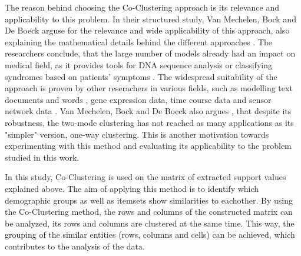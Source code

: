 The reason behind choosing the Co-Clustering approach is its relevance and applicability to this problem. In their structured study, Van Mechelen, Bock and De Boeck arguse for the relevance and wide applicability of this approach, also explaining the mathematical details behind the different approaches \cite{coclustering}. The researchers conclude, that the large number of models already had an impact on medical field, as it provides tools for DNA sequence analysis or classifying syndromes based on patients' symptoms \cite{coclustering}.  The widespread suitability of the approach is proven by other reserachers in various fields, such as modelling text documents and words \cite{coclustering_documents}, gene expression data, time course data and sensor network data \cite{cho2008co}. Van Mechelen, Bock and De Boeck also argues \cite{coclustering}, that despite its robustness, the two-mode clustering has not reached as many applications as its "simpler" version, one-way clustering.
This is another motivation towards experimenting with this method and evaluating its applicability to the problem studied in this work. 

In this study, Co-Clustering is used on the matrix of extracted support values explained above. The aim of applying this method is to identify which demographic groups as well as itemsets show similarities to eachother. By using the Co-Clustering method, the rows and columns of the constructed matrix can be analyzed, its rows and columns are clustered at the same time. This way, the grouping of the similar entities (rows, columns and cells) can be achieved, which contributes to the analysis of the data.

